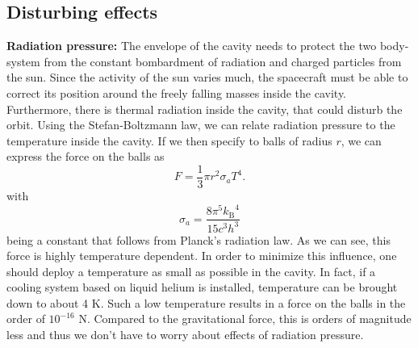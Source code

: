 \documentclass[prb,preprint]{revtex4-1}
\begin{document}
\subsection{Disturbing effects}

\textbf{Radiation pressure:} The envelope of the cavity needs to protect the two body-system from the constant bombardment of radiation and charged particles from the sun. Since the activity of the sun varies much, the spacecraft must be able to correct its position around the freely falling masses inside the cavity.\\
Furthermore, there is thermal radiation inside the cavity, that could disturb the orbit.
Using the Stefan-Boltzmann law, we can relate radiation pressure to the temperature inside the cavity. If we then specify to balls of radius $r$, we can express the force on the balls as 
\begin{equation}
F = \frac{1}{3} \pi r^2 \sigma_a T^4.
\end{equation}
with
\begin{equation}
\label{eq:a}
\sigma_a = \frac{8 \pi^5 {k_\mathrm{B}}^4}{15 c^3 h^3}
\end{equation}
being a constant that follows from Planck's radiation law.
%
%
%
As we can see, this force is highly temperature dependent. In order to minimize this influence, one should deploy a temperature as small as possible in the cavity. In fact, if a cooling system based on liquid helium is installed, temperature can be brought down to about 4 K. Such a low temperature results in a force on the balls in the order of $10^{-16}$ N. Compared to the gravitational force, this is orders of magnitude less and thus we don't have to worry about effects of radiation pressure.\\
\end{document}

